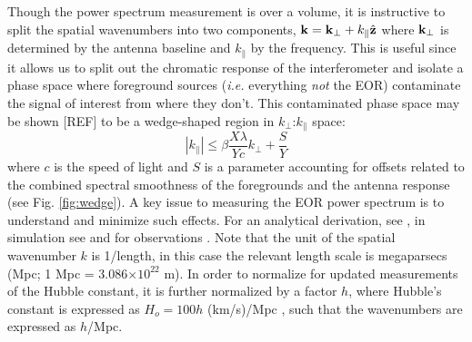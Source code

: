 \documentclass[preprint,11pt]{aastex}
\newcommand{\kvec}{{\bf k}}
\newcommand{\kpr}{{k_\perp}}
\newcommand{\kvpr}{{\kvec_\perp}}
\def\kpar{k_{\|}}
\begin{document}
Though the power spectrum measurement is over a volume, it is instructive to split the spatial wavenumbers into two components,  $\kvec =  \kvpr + \kpar{\hat {\bf z}}$ where $\kvpr$ is determined by the antenna baseline and $\kpar$ by the frequency.  This is useful since it allows us to split out the chromatic response of the interferometer and isolate a phase space where foreground sources ({\em i.e.} everything {\em not} the EOR) contaminate the signal of interest from where they don't.  This contaminated phase space may be shown [REF] to be a wedge-shaped region in $\kpr$:$\kpar$ space:
\begin{equation}
|\kpar| \le \beta\frac{X\lambda}{Yc}\kpr + \frac{S}{Y}
\end{equation}
where $c$ is the speed of light and $S$ is a parameter accounting for offsets related to the combined spectral smoothness of the foregrounds and the antenna response (see Fig. \ref{fig:wedge}).  
A key issue to measuring the EOR power spectrum is to understand and minimize such effects.  For an analytical derivation, see \cite{zahn_etal2012,vedantham_2012,liu_et_al2014b},  in simulation see \cite{datta_etal2010,hazelton_et_al2013} and for observations
\cite{pober_etal2013b,2015arXiv150601026P,parsons_etal2014,2015arXiv150206016A}.  Note that the unit of the spatial wavenumber $k$ is 1/length, in this case the relevant length scale is megaparsecs (Mpc; 1 Mpc = 3.086$\times10^{22}$ m).  In order to normalize for updated measurements of the Hubble constant, it is further normalized by a factor $h$, where Hubble's constant is expressed as $H_o=100h$ (km/s)/Mpc , such that the wavenumbers are expressed as $h$/Mpc.
\end{document}
